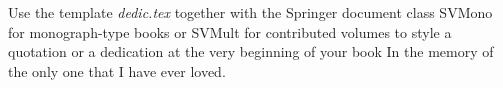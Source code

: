 
%
%
%

\begin{dedication}
Use the template \emph{dedic.tex} together with the Springer document class SVMono for monograph-type books or SVMult for contributed volumes to style a quotation or a dedication at the very beginning of your book
In the memory of the only one that I have ever loved.
\end{dedication}




